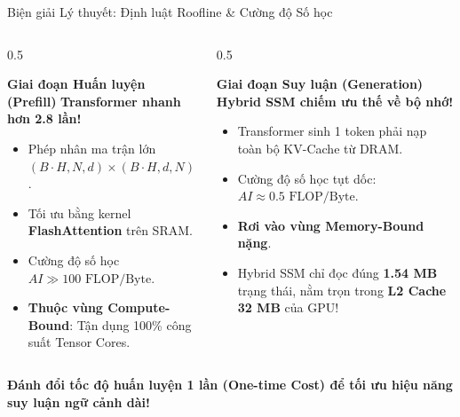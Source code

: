 \documentclass[aspectratio=169, 10pt]{beamer}
\begin{document}
\begin{frame}{Biện giải Lý thuyết: Định luật Roofline \& Cường độ Số học}
  \begin{columns}
    \begin{column}{0.5\textwidth}
      \begin{block}{\textbf{Giai đoạn Huấn luyện (Prefill)}}
        \centering
        \textbf{Transformer nhanh hơn 2.8 lần!}
        \begin{itemize}
          \item Phép nhân ma trận lớn $(B \cdot H, N, d) \times (B \cdot H, d, N)$.
          \item Tối ưu bằng kernel \textbf{FlashAttention} trên SRAM.
          \item Cường độ số học $AI \gg 100\text{ FLOP/Byte}$.
          \item \textbf{Thuộc vùng Compute-Bound}: Tận dụng 100\% công suất Tensor Cores.
        \end{itemize}
      \end{block}
    \end{column}
    \begin{column}{0.5\textwidth}
      \begin{block}{\textbf{Giai đoạn Suy luận (Generation)}}
        \centering
        \textbf{Hybrid SSM chiếm ưu thế về bộ nhớ!}
        \begin{itemize}
          \item Transformer sinh 1 token phải nạp toàn bộ KV-Cache từ DRAM.
          \item Cường độ số học tụt dốc: $AI \approx 0.5\text{ FLOP/Byte}$.
          \item \textbf{Rơi vào vùng Memory-Bound nặng}.
          \item Hybrid SSM chỉ đọc đúng \textbf{1.54 MB} trạng thái, nằm trọn trong \textbf{L2 Cache 32 MB} của GPU!
        \end{itemize}
      \end{block}
    \end{column}
  \end{columns}
  \vspace{0.2cm}
  \centering
  \textbf{\color{UETBlue}Đánh đổi tốc độ huấn luyện 1 lần (One-time Cost) để tối ưu hiệu năng suy luận ngữ cảnh dài!}
\end{frame}
\end{document}
